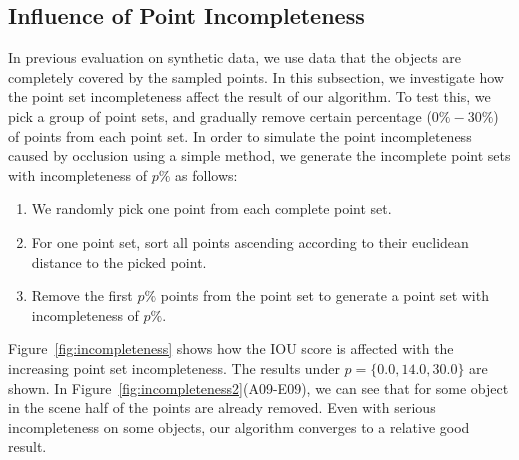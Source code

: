 \subsection{Influence of Point Incompleteness}
\label{sec:exp-incompleteness}
In previous evaluation on synthetic data, we use data that the objects are completely covered by the sampled points. 
%
In this subsection, we investigate how the point set incompleteness affect the result of our algorithm. 
%
To test this, we pick a group of point sets, and gradually remove certain percentage ($0\%-30\%$) of points from each point set. In order to simulate the point incompleteness caused by occlusion using a simple method, we generate the incomplete point sets with incompleteness of $p\%$ as follows:
\begin{enumerate}
	\item We randomly pick one point from each complete point set. 
	\item For one point set, sort all points ascending according to their euclidean distance to the picked point.  
	\item Remove the first $p\%$ points from the point set to generate a point set with incompleteness of $p\%$.
\end{enumerate}
% 
Figure~\ref{fig:incompleteness} shows how the IOU score is affected with the increasing point set incompleteness. 
The results under $p=\{0.0,14.0,30.0\}$ are shown. In Figure~\ref{fig:incompleteness2}(A09-E09), we can see that for some object in the scene half of the points are already removed. Even with serious incompleteness on some objects, our algorithm converges to a relative good result.

